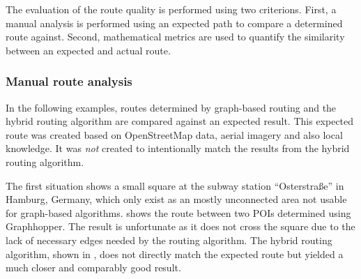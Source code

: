 			The evaluation of the route quality is performed using two criterions.
			First, a manual analysis is performed using an expected path to compare a determined route against.
			Second, mathematical metrics are used to quantify the similarity between an expected and actual route.
		
		\subsubsection{Manual route analysis}
		
			In the following examples, routes determined by graph-based routing and the hybrid routing algorithm are compared against an expected result.
			This expected route was created based on OpenStreetMap data, aerial imagery and also local knowledge.
			It was \emph{not} created to intentionally match the results from the hybrid routing algorithm.
		
			The first situation shows a small square at the subway station \enquote{Osterstraße} in Hamburg, Germany, which only exist as an mostly unconnected area not usable for graph-based algorithms.
			 shows the route between two POIs determined using Graphhopper.
			The result is unfortunate as it does not cross the square due to the lack of necessary edges needed by the routing algorithm.
			The hybrid routing algorithm, shown in , does not directly match the expected route but yielded a much closer and comparably good result.
			
